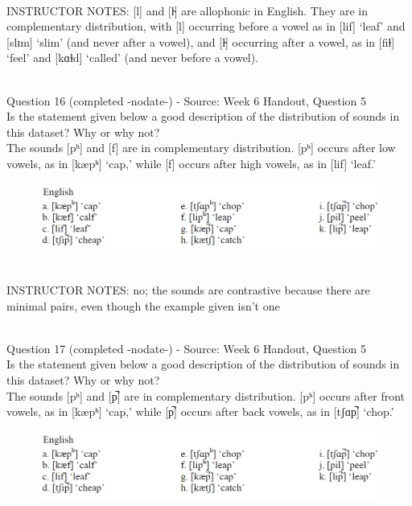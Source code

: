 \documentclass[12pt]{article}
\begin{document}
~\\
INSTRUCTOR NOTES: [l] and [l̴] are allophonic in English. They are in complementary distribution, with [l] occurring before a vowel as in [lif] ‘leaf’ and [slɪm] ‘slim’ (and never after a vowel), and [l̴] occurring after a vowel, as in [fiɫ] ‘feel’ and [kɑɫd] ‘called’ (and never before a vowel).


~\\

{\large Question 16} (completed -nodate-) - Source: Week 6 Handout, Question 5\\

Is the statement given below a good description of the distribution of sounds in this dataset? Why or why not?\\

The sounds {[pʰ]} and {[f]} are in complementary distribution. {[pʰ]} occurs after low vowels, as in {[kæpʰ]} ‘cap,’ while {[f]} occurs after high vowels, as in {[lif]} ‘leaf.’

\begin{figure}[H]
\includegraphics{../images/english_labials.png}
\end{figure}

~\\
INSTRUCTOR NOTES: no; the sounds are contrastive because there are minimal pairs, even though the example given isn't one


~\\

{\large Question 17} (completed -nodate-) - Source: Week 6 Handout, Question 5\\

Is the statement given below a good description of the distribution of sounds in this dataset? Why or why not?\\

The sounds {[pʰ]} and {[p̚]} are in complementary distribution. {[pʰ]} occurs after front vowels, as in {[kæpʰ]} ‘cap,’ while {[p̚]} occurs after back vowels, as in {[tʃɑp̚]} ‘chop.’

\begin{figure}[H]
\includegraphics{../images/english_labials.png}
\end{figure}
\end{document}
